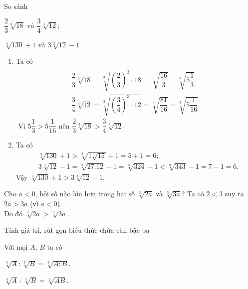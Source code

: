 \begin{vd}%
	So sánh \begin{listEX}[2]
	\item $\dfrac{2}{3}\sqrt[3]{18}\text{ và }\dfrac{3}{4}\sqrt[3]{12}$;
	\item $\sqrt[3]{130} + 1\text{ và } 3\sqrt[3]{12} - 1$
	\end{listEX}
	\loigiai
	{
	\begin{enumerate}
	\item Ta có \allowdisplaybreaks \begin{align*}
	\begin{array}{l}
	{\dfrac{2}{3}\sqrt[3]{18}=\sqrt[3]{\left(\dfrac{2}{3}\right)^3\cdot 18}=\sqrt[3]{\dfrac{16}{3}}=\sqrt[3]{5\dfrac{1}{3}}}.\\
	{\dfrac{3}{4}\sqrt[3]{12}=\sqrt[3]{\left(\dfrac{3}{4}\right)^3\cdot 12}=\sqrt[3]{\dfrac{81}{16}}=\sqrt[3]{5\dfrac{1}{16}}}
	\end{array}.
	\end{align*}
	$\text{ Vì }	5\dfrac{1}{3}> 5\dfrac{1}{16}\text{ nên }\dfrac{2}{3}\sqrt[3]{18}>\dfrac{3}{4}\sqrt[3]{12}$.
	\item Ta có 
	\allowdisplaybreaks \begin{align*}
	&\sqrt[3]{130} + 1>\sqrt[3]{1\sqrt{15}} + 1=5 + 1=6;
	\\ &3\sqrt[3]{12} - 1=\sqrt[3]{27.12} - 1=\sqrt[3]{324} - 1<\sqrt[3]{343} - 1=7 - 1=6 .
	\end{align*}
	Vậy $\sqrt[3]{130} + 1>3\sqrt[3]{12} - 1$.
	\end{enumerate}
	}
\end{vd}
\begin{vd}%
	Cho $a<0$, hỏi số nào lớn hơn trong hai số $\sqrt[3]{2a}$ và $\sqrt[3]{3a}$?
	\loigiai
	{Ta có $2<3$ suy ra $2a>3a$ (vì $a<0$).\\ Do đó $\sqrt[3]{2a}>\sqrt[3]{3a}$.
	}
\end{vd}
\begin{dang}{Tính giá trị, rút gọn biểu thức chứa căn bậc ba}
	\begin{note}
	Với mọi $A$, $B$ ta có
	\begin{enumEX}[\itemCI]{2}
	\item $\sqrt[3]{A}:\sqrt[3]{B}=\sqrt[3]{A:B}$.
	\item 
	$\sqrt[3]{A}\cdot\sqrt[3]{B}=\sqrt[3]{AB}$.
	\end{enumEX}
	\end{note}
\end{dang}
